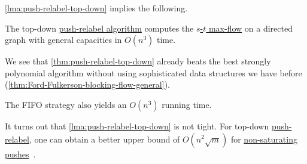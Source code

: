 \autoref{lma:push-relabel-top-down} implies the following.

\begin{theorem}\label{thm:push-relabel-top-down}
	The top-down \hyperref[algo:push-relabel]{push-relabel algorithm} computes the \hyperref[prb:s-t-max-flow]{\(s\)-\(t\) max-flow} on a directed graph with general capacities in \(O(n^3)\) time.
\end{theorem}

We see that \autoref{thm:push-relabel-top-down} already beats the best strongly polynomial algorithm without using sophisticated data structures we have before (\autoref{thm:Ford-Fulkerson-blocking-flow-general}).

\begin{note}
	The FIFO strategy also yields an \(O(n^3)\) running time.
\end{note}

It turns out that \autoref{lma:push-relabel-top-down} is not tight. For top-down \hyperref[algo:push-relabel]{push-relabel}, one can obtain a better upper bound of \(O(n^2 \sqrt{m} )\) for \hyperref[algo:push-relabel-push-non-saturating]{non-saturating pushes}~\cite{cheriyan1989analysis,tunccel1994complexity}.

